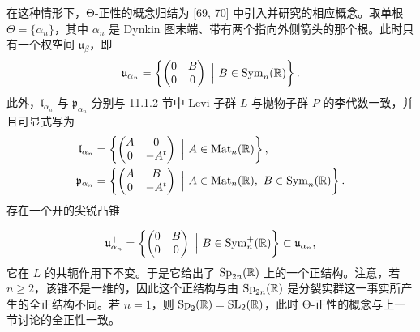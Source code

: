 在这种情形下，Θ-正性的概念归结为 [69, 70] 中引入并研究的相应概念。取单根 $\Theta=\{\alpha_n\}$，其中 $\alpha_n$ 是 Dynkin 图末端、带有两个指向外侧箭头的那个根。此时只有一个权空间 $\mathfrak{u}_\beta$，即
\[
\mathfrak{u}_{\alpha_n}=\left\{\begin{pmatrix} 0 & B\\ 0 & 0\end{pmatrix}\ \Big|\ B\in\operatorname{Sym}_n(\R)\right\}.
\]
此外，$\mathfrak{l}_{\alpha_n}$ 与 $\mathfrak{p}_{\alpha_n}$ 分别与 11.1.2 节中 Levi 子群 $L$ 与抛物子群 $P$ 的李代数一致，并且可显式写为
\begin{align*}
\mathfrak{l}_{\alpha_n}&=\left\{\begin{pmatrix} A & 0\\ 0 & -A^t\end{pmatrix}\ \Big|\ A\in\operatorname{Mat}_n(\R)\right\},\\
\mathfrak{p}_{\alpha_n}&=\left\{\begin{pmatrix} A & B\\ 0 & -A^t\end{pmatrix}\ \Big|\ A\in\operatorname{Mat}_n(\R),\ B\in\operatorname{Sym}_n(\R)\right\}.
\end{align*}
存在一个开的尖锐凸锥

\[
\mathfrak{u}_{\alpha_n}^+=\left\{\begin{pmatrix} 0 & B\\ 0 & 0\end{pmatrix}\ \Big|\ B\in\operatorname{Sym}_n^+(\R)\right\}\subset\mathfrak{u}_{\alpha_n},
\]
它在 $L$ 的共轭作用下不变。于是它给出了 $\operatorname{Sp}_{2n}(\mathbb{R})$ 上的一个正结构。注意，若 $n\ge 2$，该锥不是一维的，因此这个正结构与由 $\operatorname{Sp}_{2n}(\mathbb{R})$ 是分裂实群这一事实所产生的全正结构不同。若 $n=1$，则 $\operatorname{Sp}_2(\mathbb{R})=\operatorname{SL}_2(\mathbb{R})$，此时 Θ-正性的概念与上一节讨论的全正性一致。

